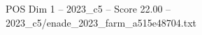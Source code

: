 \begin{textsample}{POS Dim 1 – 2023\_c5 – Score 22.00 – 2023\_c5/enade\_2023\_farm\_a515e48704.txt}
\end{textsample}
